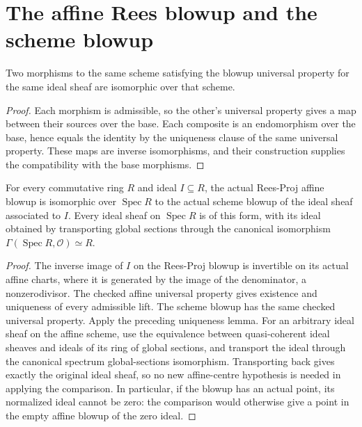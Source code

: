 \section{The affine Rees blowup and the scheme blowup}

\begin{lemma}\label{lem:sc0-blowup-universal-iso}
\leanok
Two morphisms to the same scheme satisfying the blowup universal property for the same ideal
sheaf are isomorphic over that scheme.
\end{lemma}
\begin{proof}
Each morphism is admissible, so the other's universal property gives a map between their
sources over the base. Each composite is an endomorphism over the base, hence equals the
identity by the uniqueness clause of the same universal property. These maps are inverse
isomorphisms, and their construction supplies the compatibility with the base morphisms.
\end{proof}

\begin{lemma}\label{lem:sc0-affine-global-blowup-iso}
\leanok
{}
For every commutative ring $R$ and ideal $I\subseteq R$, the actual Rees-Proj affine blowup
is isomorphic over $\operatorname{Spec}R$ to the actual scheme blowup of the ideal sheaf
associated to $I$. Every ideal sheaf on $\operatorname{Spec}R$ is of this form, with its ideal
obtained by transporting global sections through the canonical isomorphism
$\Gamma(\operatorname{Spec}R,\mathcal O)\simeq R$.
\end{lemma}
\begin{proof}
The inverse image of $I$ on the Rees-Proj blowup is invertible on its actual affine charts,
where it is generated by the image of the denominator, a nonzerodivisor. The checked affine
universal property gives existence and uniqueness of every admissible lift. The scheme blowup
has the same checked universal property. Apply the preceding uniqueness lemma.
For an arbitrary ideal sheaf on the affine scheme, use the equivalence between quasi-coherent
ideal sheaves and ideals of its ring of global sections, and transport the ideal through the
canonical spectrum global-sections isomorphism. Transporting back gives exactly the original
ideal sheaf, so no new affine-centre hypothesis is needed in applying the comparison.
In particular, if the blowup has an actual point, its normalized ideal cannot be zero:
the comparison would otherwise give a point in the empty affine blowup of the zero ideal.
\end{proof}
